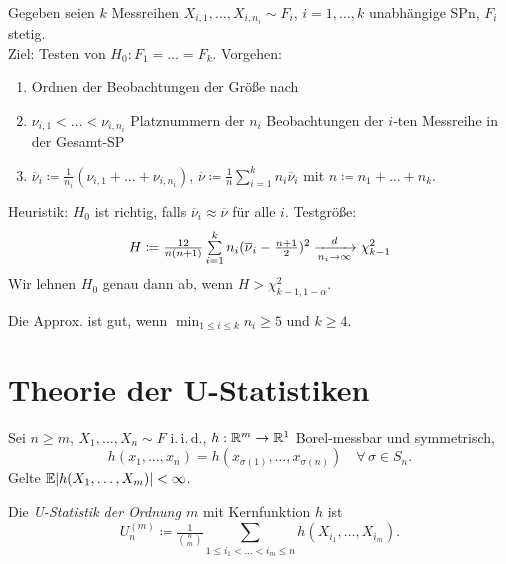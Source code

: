 \documentclass{cheat-sheet}
\newcommand{\E}{\mathbb{E}} %
\newcommand{\iid}{i.\,i.\,d.} %
\newcommand{\testh}[1]{\textcolor{TestColor}{\textbf{#1}}}
\begin{document}
\begin{test}
  Gegeben seien $k$ Messreihen $X_{i,1}, \ldots, X_{i,n_i} \sim F_i$, $i = 1, \ldots, k$ unabhängige SPn, $F_i$ stetig. \\
  Ziel: Testen von \testh{$H_0 : F_1 = \ldots = F_k$}.
  Vorgehen:
  \begin{enumerate}
    \item Ordnen der Beobachtungen der Größe nach
    \item $\nu_{i,1} < \ldots < \nu_{i,n_i}$ Platznummern der $n_i$ Beobachtungen der $i$-ten Messreihe in der Gesamt-SP
    \item $\overline{\nu}_i \coloneqq \tfrac{1}{n_i} (\nu_{i,1} + \ldots + \nu_{i,n_i})$, $\overline{\nu} \coloneqq \tfrac{1}{n} \sum_{i=1}^k n_i \overline{\nu}_i$ mit $n \coloneqq n_1 + \ldots + n_k$.
  \end{enumerate}
  Heuristik: $H_0$ ist richtig, falls $\overline{\nu}_i \approx \overline{\nu}$ für alle $i$.
  Testgröße:
  \[
    H \coloneqq \tfrac{12}{n (n+1)} \sum_{i=1}^k n_i (\overline{\nu}_i - \tfrac{n+1}{2})^2
    \xra[n_i \to \infty]{d} \chi^2_{k-1}
  \]
  Wir lehnen $H_0$ genau dann ab, wenn $H > \chi^2_{k-1,1-\alpha}$.
\end{test}

\begin{faustregel}
  Die Approx. ist gut, wenn $\min_{1 \leq i \leq k} n_i \geq 5$ und $k \geq 4$.
\end{faustregel}

\section{Theorie der U-Statistiken}


\begin{situation}
  Sei $n \geq m$, $X_1, \ldots, X_n \sim F$ \iid{}, $h : \mathbb{R}^m \to \mathbb{R}^1$ Borel-messbar und symmetrisch, \dh{}
  \[
    h(x_1, \ldots, x_n) = h(x_{\sigma(1)}, \ldots, x_{\sigma(n)}) \quad
    \forall \, \sigma \in S_n.
  \]
  Gelte $\E \abs{h(X_1, \ldots, X_m)} < \infty$.
\end{situation}

\begin{defn}
  Die \emph{U-Statistik der Ordnung $m$} mit Kernfunktion $h$ ist
  \[ U_n^{(m)} \coloneqq \tfrac{1}{\binom{n}{m}} \sum_{1 \leq i_1 < \ldots < i_m \leq n} h(X_{i_1}, \ldots, X_{i_m}). \]
\end{defn}
\end{document}
